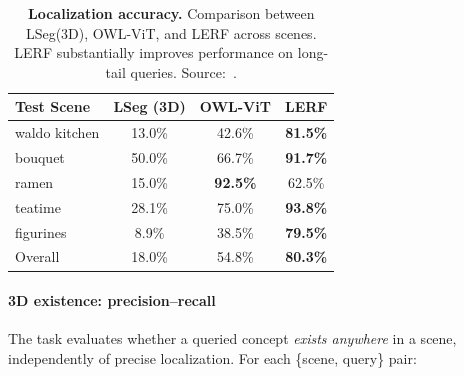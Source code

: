 \begin{enrichment}
\begin{enrichment}
        \begin{table}[H]
            \centering
            \small
            \setlength{\tabcolsep}{6pt}
            \renewcommand{\arraystretch}{1.2}
            \begin{tabular}{l|ccc}
                \toprule
                \textbf{Test Scene} & \textbf{LSeg (3D)} & \textbf{OWL-ViT} & \textbf{LERF} \\
                \midrule
                waldo kitchen & 13.0\% & 42.6\% & \textbf{81.5\%} \\
                bouquet       & 50.0\% & 66.7\% & \textbf{91.7\%} \\
                ramen         & 15.0\% & \textbf{92.5\%} & 62.5\% \\
                teatime       & 28.1\% & 75.0\% & \textbf{93.8\%} \\
                figurines     & 8.9\%  & 38.5\% & \textbf{79.5\%} \\
                \midrule
                Overall       & 18.0\% & 54.8\% & \textbf{80.3\%} \\
                \bottomrule
            \end{tabular}
            \caption{\textbf{Localization accuracy.}
                Comparison between LSeg(3D), OWL-ViT, and LERF across scenes. LERF substantially improves performance on long-tail queries. Source:~\cite{kerr2023_lerf}.}
            \label{tab:chapter23_lerf_localization}
        \end{table}
        
        \paragraph{3D existence: precision--recall}
        The task evaluates whether a queried concept \emph{exists anywhere} in a scene, independently of precise localization. For each \{scene, query\} pair:
        

\end{enrichment}
\end{enrichment}
